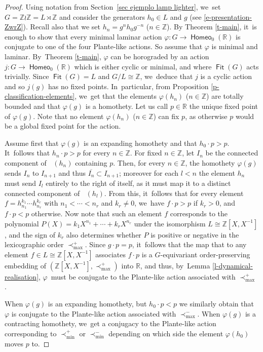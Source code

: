 \documentclass[JEP,XML,SOM,Unicode,NoFloatCountersInSection,published]{cedram}
\theoremstyle{definition}
\DeclareMathOperator{\Fit}{\mathsf{Fit}}
\DeclareMathOperator{\homeo}{\mathsf{Homeo}}
\DeclareMathOperator{\suppphi}{\mathsf{Supp}^\varphi}
\newcommand{\R}{\mathbb{R}}
\newcommand{\Z}{\mathbb Z}
\begin{document}
\begin{proof}
Using notation from Section~\ref{sec ejemplo lamp lighter}, we~set $G=\Z\wr \Z=L\rtimes\Z$ and consider the generators $h_0\in L$ and $g$ (see \eqref{e-presentation-ZwrZ}). Recall also that we set $h_n=g^nh_0g^{-n} $ ($n\in \Z$).
By Theorem \ref{t-main}, it~is enough to show that every minimal laminar action $\varphi\colon G\to \homeo_0(\R)$ is conjugate to one of the four Plante-like actions. So assume that $\varphi$ is minimal and laminar. By~Theorem \ref{t-main}, $\varphi$ can be horograded by an action $j\colon G\to\homeo_0(\R)$ which is either cyclic or minimal, and where $\Fit(G)$ acts trivially. Since $\Fit(G)=L$ and $G/L\cong\Z$, we~deduce that $j$ is a cyclic action and so $j(g)$ has no fixed points. In~particular, from Proposition \ref{p-classification-elements}, we~get that the elements $\varphi(h_n)$ ($n\in \Z$) are totally bounded and that $\varphi(g)$ is a homothety. Let us call $p\in \R$ the unique fixed point of $\varphi(g)$. Note that no element $\varphi(h_n)$ ($n\in \Z$) can fix $p$, as otherwise $p$ would be a global fixed point for the action.

Assume first that $\varphi(g)$ is an expanding homothety and that $h_0\cdot p>p$. It~follows that $h_n\cdot p>p$ for every $n\in \Z$. For fixed $n\in \Z$, let $I_n$ be the connected component of $\suppphi(h_n)$ containing $p$. Then, for every $n\in \Z$, the homothety $\varphi(g)$ sends $I_n$ to $I_{n+1}$ and thus $\overline{I_n}\subset I_{n+1}$; moreover for each $l<n$ the element $h_n$ must send $I_l$ entirely to the right of itself, as it must map it to a distinct connected component of $\suppphi(h_l)$. From this, it~follows that for every element $f=h_{n_1}^{k_1}\cdots h_{n_r}^{k_r}$ with $n_1<\cdots<n_r$ and $k_r\neq 0$, we~have $f\cdot p>p$ if $k_r>0$, and $f\cdot p<p$ otherwise. Now note that such an element $f$ corresponds to the polynomial $P(X)=k_1X^{n_1}+\cdots +k_r X^{n_r}$ under the isomorphism $L\cong \Z[X, X^{-1}]$, and the sign of $k_r$ also determines whether $P$ is positive or negative in the lexicographic order $\prec_{\max}^+$. Since $g\cdot p=p$, it~follows that the map that to any element $f\in L\cong \Z[X,X^{-1}]$ associates $f\cdot p$ is a $G$-equivariant order-preserving embedding of $(\Z[X,X^{-1}], \prec_{\max}^+)$ into $\R$, and thus, by~Lemma \ref{l-dynamical-realisation}, $\varphi$~must be conjugate to the Plante-like action associated with $\prec_{\max}^+$ .

When $\varphi(g)$ is an expanding homothety, but $h_0\cdot p<p$ we similarly obtain that $\varphi$ is conjugate to the Plante-like action associated with $\prec_{\max}^-$. When $\varphi(g)$ is a contracting homothety, we~get a conjugacy to the Plante-like action corresponding to $\prec_{\min}^+$ or $\prec_{\min}^-$ depending on which side the element $\varphi(h_0)$ moves $p$ to.
\end{proof}
\end{document}
